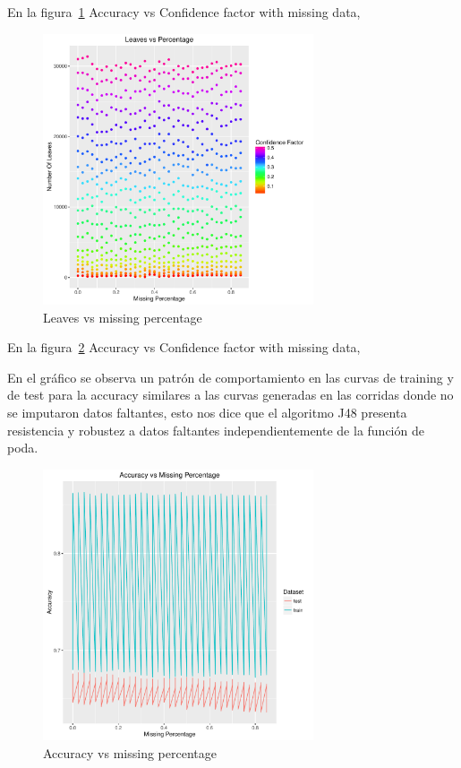 En la figura~\ref{fig:4b} Accuracy vs Confidence factor with missing data,

\begin{figure}
  \centering
  \includegraphics[width = 8cm]{4b.pdf}
  \caption{Leaves vs missing percentage}
  \label{fig:4b}
\end{figure}

En la figura~\ref{fig:4c} Accuracy vs Confidence factor with missing data,

En el gráfico se observa un patrón de comportamiento en las curvas de training y de test para la accuracy
similares a las curvas generadas en las corridas donde no se imputaron datos faltantes,
esto nos dice que el algoritmo J48 presenta resistencia y robustez a datos faltantes independientemente de la función de poda.


\begin{figure}
  \centering
  \includegraphics[width = 8cm]{4c.pdf}
  \caption{Accuracy vs missing percentage}
  \label{fig:4c}
\end{figure}

